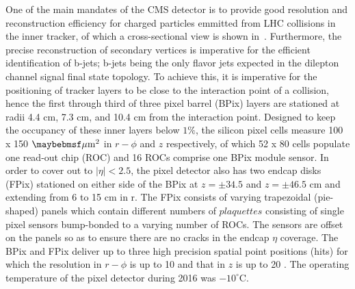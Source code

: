One of the main mandates of the CMS detector is to provide good resolution and reconstruction efficiency for charged particles emmitted from LHC collisions in the inner tracker, of which a cross-sectional view is shown in~. Furthermore, the precise reconstruction of secondary vertices is imperative for the efficient identification of b-jets; b-jets being the only flavor jets expected in the dilepton channel \ttDM signal final state topology. To achieve this, it is imperative for the positioning of tracker layers to be close to the interaction point of a collision, hence the first through third of three pixel barrel (BPix) layers are stationed at radii 4.4 cm, 7.3 cm, and 10.4 cm from the interaction point. Designed to keep the occupancy of these inner layers below $1\%$, the silicon pixel cells measure 100 x 150 $\mum^2$ in $r-\phi$ and $z$ respectively, of which 52 x 80 cells populate one read-out chip (ROC) and 16 ROCs comprise one BPix module sensor. In order to cover out to $|\eta|<2.5$, the pixel detector also has two endcap disks (FPix) stationed on either side of the BPix at $z=\pm34.5$ and $z=\pm46.5$ cm and extending from 6 to 15 cm in r. The FPix consists of varying trapezoidal (pie-shaped) panels which contain different numbers of $plaquettes$ consisting of single pixel sensors bump-bonded to a varying number of ROCs. The sensors are offset on the panels so as to ensure there are no cracks in the endcap $\eta$ coverage. The BPix and FPix deliver up to three high precision spatial point positions (hits) for which the resolution in $r-\phi$ is up to 10 \mum and that in $z$ is up to 20 \mum. The operating temperature of the pixel detector during 2016 was $-10^\circ$C.


